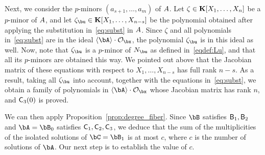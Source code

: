 \documentclass[12pt]{article}
\begin{document}
Next, we consider the $p$-minors $(a_{s+1},\dots,a_m)$ of ${A}$. Let
$\zeta \in\mathbf{K}[X_1,\dots,X_n]$ be a $p$-minor of ${A}$, and let
$\zeta_\bu \in \KK[X_1,\dots,X_{n-s}]$ be the polynomial obtained
after applying the substitution in~\eqref{eq:subst} in ${A}$. Since
$\zeta$ and all polynomials in~\eqref{eq:subst} are in the ideal
$\langle \bA \rangle \cdot \mathcal{O}_\bx$, the polynomial
$\zeta_\bu$ is in this ideal as well. Now, note that $\zeta_\bu$ is a
$p$-minor of $\mN_\bu$ as defined in~\eqref{eqdef:Lu}, and that all
its $p$-minors are obtained this way. We pointed out above that the
Jacobian matrix of these equations with respect to $X_1,\dots,X_{n-s}$
has full rank $n-s$. As a result, taking all $\zeta_\bu$ into account,
together with the equations in~\eqref{eq:subst}, we obtain 
a family of polynomials in $\langle \bA \rangle \cdot \mathcal{O}_\bx$ 
whose Jacobian matrix has rank $n$, and $\mathsf{C}_3(0)$ is proved.

\medskip

We can then apply Proposition~\ref{prop:degree_fiber}. Since $\bB$
satisfies $\mathsf{B}_1,\mathsf{B}_2$ and $\bA=\bB_0$ satisfies
$\mathsf{C}_1,\mathsf{C}_2,\mathsf{C}_3$, we deduce that the sum of the
multiplicities of the isolated solutions of $\bC=\bB_1$ is at most
$c$, where $c$ is the number of solutions of $\bA$. Our next step
is to establish the value of $c$.
\end{document}
